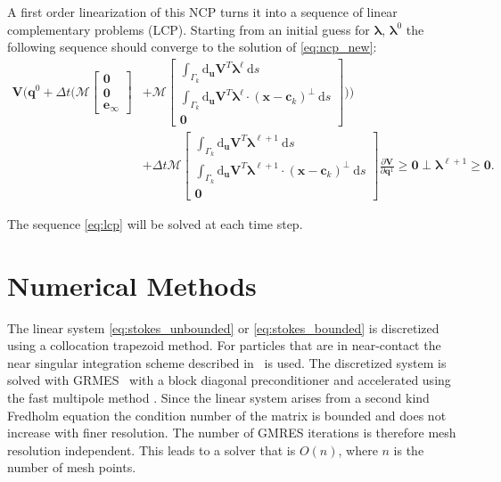 \documentclass[preprint, 10pt]{elsarticle}
\begin{document}
A first order linearization of this NCP turns it into a sequence of linear complementary problems (LCP). Starting from an initial guess for $\pmb{\lambda}$, $\pmb{\lambda}^0$ the following sequence should converge to the solution of \eqref{eq:ncp_new}:
\begin{equation}\label{eq:lcp}\begin{aligned}
\mathbf{V}\biggl(\mathbf{q}^0 + \Delta t\biggl(\mathcal{M}\begin{bmatrix}\mathbf{0}\\\mathbf{0}\\\mathbf{e}_\infty\end{bmatrix} &+ \mathcal{M}\begin{bmatrix} \int_{\Gamma_k} \text{d}_\mathbf{u}\mathbf{V}^T\pmb{\lambda}^\ell~\text{d}s\\ \int_{\Gamma_k}  \text{d}_\mathbf{u}\mathbf{V}^T\pmb{\lambda}^\ell\cdot(\mathbf{x}-\mathbf{c}_k)^\perp~\text{d}s \\\mathbf{0}\end{bmatrix}\biggr)\biggr) \\
&+ \Delta t \mathcal{M}\begin{bmatrix}\int_{\Gamma_k} \text{d}_\mathbf{u}\mathbf{V}^T\pmb{\lambda}^{\ell+1}~\text{d}s\\ \int_{\Gamma_k}  \text{d}_\mathbf{u}\mathbf{V}^T\pmb{\lambda}^{\ell+1}\cdot(\mathbf{x}-\mathbf{c}_k)^\perp~\text{d}s \\\mathbf{0}\end{bmatrix}\frac{\partial\mathbf{V}}{\partial \mathbf{q}^1} \geq \mathbf{0} \perp \pmb{\lambda}^{\ell+1} \geq \mathbf{0}.\end{aligned}\end{equation}

The sequence \eqref{eq:lcp} will be solved at each time step. 



		
\section{Numerical Methods\label{s:method}} 

The linear system \eqref{eq:stokes_unbounded} or
\eqref{eq:stokes_bounded} is discretized using a collocation trapezoid
method. For particles that are in near-contact the near singular
integration scheme described in~\cite{Quaife2014, Ying2006} is used. The
discretized system is solved with GRMES~\cite{Saad1986} with a block
diagonal preconditioner and accelerated using the fast multipole method
\cite{Greengard1987}.  Since the linear system arises from a second kind
Fredholm equation the condition number of the matrix is bounded and does
not increase with finer resolution. The number of GMRES iterations is
therefore mesh resolution independent. This leads to a solver that is
$O(n)$, where $n$ is the number of mesh points. 
\end{document}
